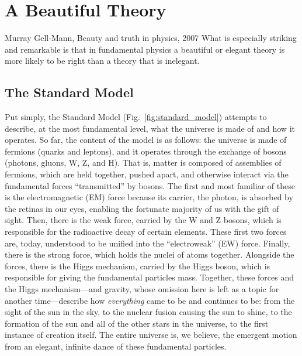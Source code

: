 \chapter{A Beautiful Theory}
\begin{aquote}{Murray Gell-Mann, Beauty and truth in physics, 2007}
    What is especially striking and remarkable is that in fundamental physics 
    a beautiful or elegant theory is more likely to be right 
    than a theory that is inelegant.
\end{aquote}

\section{The Standard Model}
Put simply, the Standard Model (Fig.~\ref{fig:standard_model}) attempts to describe, at the most fundamental level, what the universe is made of and how it operates. 
So far, the content of the model is as follows: the universe is made of fermions (quarks and leptons), and it operates through the exchange of bosons (photons, gluons, W, Z, and H). 
That is, matter\footnotemark{} is composed of assemblies of fermions, which are held together, pushed apart, and otherwise interact via the fundamental forces ``transmitted'' by bosons. 
The first and most familiar of these is the electromagnetic (EM) force because its carrier, the photon, is absorbed by the retinas in our eyes, enabling the fortunate majority of us with the gift of sight. 
Then, there is the weak force, carried by the W and Z bosons, which is responsible for the radioactive decay of certain elements. 
These first two forces are, today, understood to be unified into the ``electroweak'' (EW) force. 
Finally, there is the strong force, which holds the nuclei of atoms together. 
Alongside the forces, there is the Higgs mechanism, carried by the Higgs boson, which is responsible for giving the fundamental particles mass. 
Together, these forces and the Higgs mechanism---and gravity, whose omission here is left as a topic for another time---describe how \textit{everything} came to be and continues to be: from the sight of the sun in the sky, to the nuclear fusion causing the sun to shine, to the formation of the sun and all of the other stars in the universe, to the first instance of creation itself. 
The entire universe is, we believe, the emergent motion from an elegant, infinite dance of these fundamental particles. 

